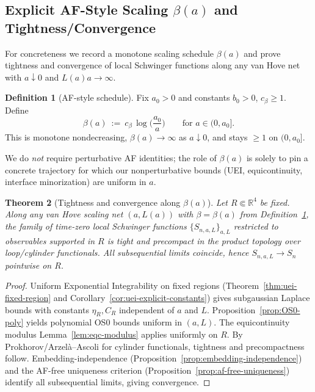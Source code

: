 \documentclass[11pt]{amsart}
\theoremstyle{plain}
\newtheorem{theorem}{Theorem}[section]
\theoremstyle{definition}
\newtheorem{definition}[theorem]{Definition}
\theoremstyle{remark}
\begin{document}
\subsection{Explicit AF-Style Scaling $\beta(a)$ and Tightness/Convergence}\label{subsec:beta-schedule}

For concreteness we record a monotone scaling schedule $\beta(a)$ and prove tightness and convergence of local Schwinger functions along any van Hove net with $a\downarrow 0$ and $L(a) a\to\infty$.

\begin{definition}[AF-style schedule]\label{def:beta-schedule}
Fix $a_0>0$ and constants $b_0>0$, $c_\beta\ge 1$. Define
\[
  \beta(a)\ :=\ c_\beta\,\log\Big(\frac{a_0}{a}\Big)\qquad \text{for } a\in(0,a_0].
\]
This is monotone nondecreasing, $\beta(a)\to\infty$ as $a\downarrow 0$, and stays $\ge 1$ on $(0,a_0]$.
\end{definition}

We do \emph{not} require perturbative AF identities; the role of $\beta(a)$ is solely to pin a concrete trajectory for which our nonperturbative bounds (UEI, equicontinuity, interface minorization) are uniform in $a$.

\begin{theorem}[Tightness and convergence along $\beta(a)$]\label{thm:tightness-beta}
Let $R\Subset\mathbb R^4$ be fixed. Along any van Hove scaling net $(a,L(a))$ with $\beta=\beta(a)$ from Definition~\ref{def:beta-schedule}, the family of time-zero local Schwinger functions $\{S_{n,a,L}\}_{a,L}$ restricted to observables supported in $R$ is tight and precompact in the product topology over loop/cylinder functionals. All subsequential limits coincide, hence $S_{n,a,L}\to S_n$ pointwise on $R$.
\end{theorem}
\begin{proof}
Uniform Exponential Integrability on fixed regions (Theorem~\ref{thm:uei-fixed-region} and Corollary~\ref{cor:uei-explicit-constants}) gives subgaussian Laplace bounds with constants $\eta_R,C_R$ independent of $a$ and $L$. Proposition~\ref{prop:OS0-poly} yields polynomial OS0 bounds uniform in $(a,L)$. The equicontinuity modulus Lemma~\ref{lem:eqc-modulus} applies uniformly on $R$. By Prokhorov/Arzel\`a--Ascoli for cylinder functionals, tightness and precompactness follow. Embedding-independence (Proposition~\ref{prop:embedding-independence}) and the AF-free uniqueness criterion (Proposition~\ref{prop:af-free-uniqueness}) identify all subsequential limits, giving convergence.
\end{proof}
\end{document}
